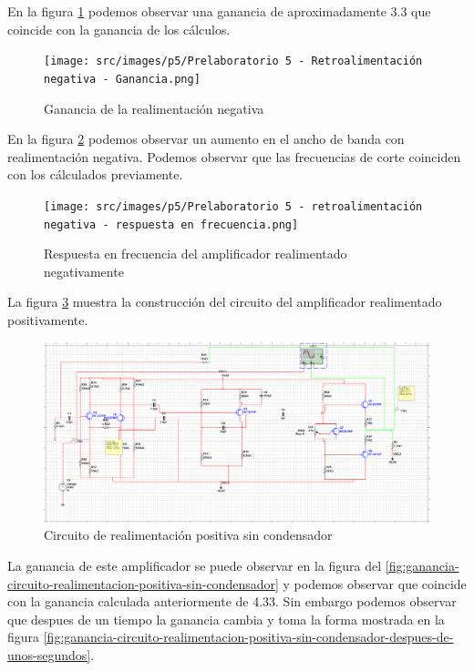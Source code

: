 En la figura \ref{fig:ganancia-realimentacion-negativa} podemos observar una ganancia de aproximadamente $3.3$ que coincide con la ganancia de los cálculos.

\begin{figure}[ht]
    \centering
    \texttt{[image: src/images/p5/Prelaboratorio 5 - Retroalimentación negativa - Ganancia.png]}
    \caption{Ganancia de la realimentación negativa}
    \label{fig:ganancia-realimentacion-negativa}
\end{figure}

En la figura \ref{fig:respuesta-frecuencia-realimentacion-negativa} podemos observar un aumento en el ancho de banda con realimentación negativa. Podemos observar que las frecuencias de corte coinciden con los cálculados previamente.

\begin{figure}[ht]
    \centering
    \texttt{[image: src/images/p5/Prelaboratorio 5 - retroalimentación negativa - respuesta en frecuencia.png]}
    \caption{Respuesta en frecuencia del amplificador realimentado negativamente}
    \label{fig:respuesta-frecuencia-realimentacion-negativa}
\end{figure}
\FloatBarrier


La figura \ref{fig:circuito-realimentacion-positiva-sin-condensador} muestra la construcción del circuito del amplificador realimentado positivamente.

\begin{figure}[ht]
    \centering
    \includegraphics[width=\textwidth]{src/images/p5/Prelaboratorio 5 - Realimentacion positiva sin condensador - circuito.png}
    \caption{Circuito de realimentación positiva sin condensador}
    \label{fig:circuito-realimentacion-positiva-sin-condensador}
\end{figure}

La ganancia de este amplificador se puede observar en la figura del \ref{fig:ganancia-circuito-realimentacion-positiva-sin-condensador} y podemos observar que coincide con la ganancia calculada anteriormente de 4.33. Sin embargo podemos observar que despues de un tiempo la ganancia cambia y toma la forma mostrada en la figura \ref{fig:ganancia-circuito-realimentacion-positiva-sin-condensador-despues-de-unos-segundos}.

